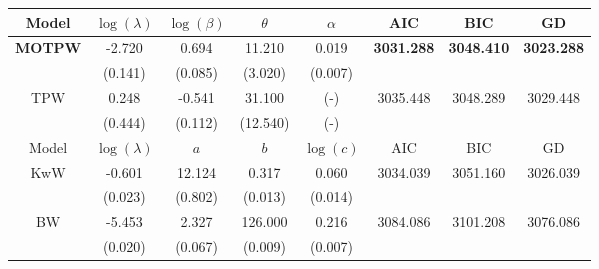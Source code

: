 \documentclass[12pt]{article}
\begin{document}
\begin{table}[htb!]
	\vspace*{0.3cm}
	\begin{tabular}{ccccc|ccc}
		\hline
		Model      &$\log(\lambda)$      & $\log(\beta)$ & $\theta$  & $\alpha$ &AIC      &BIC     &GD    \\
		\hline
		{\bf MOTPW}     &-2.720  &0.694   &11.210   &0.019 &{\bf 3031.288}  &{\bf 3048.410} &{\bf 3023.288}\\
		&(0.141)  &(0.085) &(3.020) &(0.007) &&&\\
		TPW       &0.248   &-0.541  &31.100   &(-)        &3035.448  &3048.289  &3029.448\\
		          &(0.444) &(0.112) &(12.540) &(-)      &&&      \\
        \hline
        Model      &$\log(\lambda)$      &$a$ & $b$  &$\log(c)$ &AIC      &BIC     &GD    \\
		\hline
		KwW       &-0.601  &12.124  &0.317   &0.060    &3034.039  &3051.160  &3026.039\\
		          &(0.023) &(0.802) &(0.013) &(0.014)  &          &          &        \\
		BW        &-5.453  &2.327   &126.000 &0.216    &3084.086  &3101.208  &3076.086\\
		          &(0.020) &(0.067) &(0.009) &(0.007)  &          &          &        \\
		\hline
		\end{tabular}
		\end{table}	
%		
\end{document}
